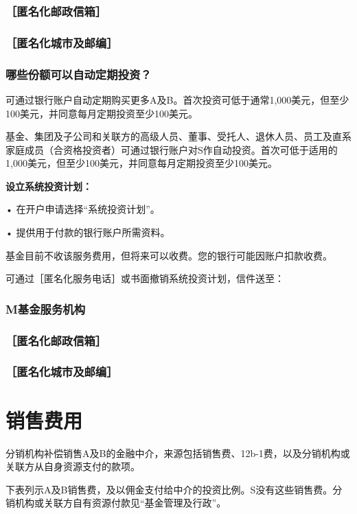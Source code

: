 \documentclass[UTF8,fontset=none,11pt,a4paper]{ctexart}
\begin{document}
\subsubsection*{［匿名化邮政信箱］}
\subsubsection*{［匿名化城市及邮编］}
\subsubsection*{哪些份额可以自动定期投资？}
可通过银行账户自动定期购买更多A及B。首次投资可低于通常1,000美元，但至少100美元，并同意每月定期投资至少100美元。

基金、集团及子公司和关联方的高级人员、董事、受托人、退休人员、员工及直系家庭成员（合资格投资者）可通过银行账户对S作自动投资。首次可低于适用的1,000美元，但至少100美元，并同意每月定期投资至少100美元。

\textbf{设立系统投资计划：}

\noindent • 在开户申请选择“系统投资计划”。\par\smallskip
\noindent • 提供用于付款的银行账户所需资料。\par\smallskip
基金目前不收该服务费用，但将来可以收费。您的银行可能因账户扣款收费。

可通过［匿名化服务电话］或书面撤销系统投资计划，信件送至：

\subsubsection*{M基金服务机构}
\subsubsection*{［匿名化邮政信箱］}
\subsubsection*{［匿名化城市及邮编］}

\par{}\label{originalpage13}
\section*{销售费用}\label{unitU475}
分销机构补偿销售A及B的金融中介，来源包括销售费、12b-1费，以及分销机构或关联方从自身资源支付的款项。

下表列示A及B销售费，及以佣金支付给中介的投资比例。S没有这些销售费。分销机构或关联方自有资源付款见“基金管理及行政”。
\end{document}
